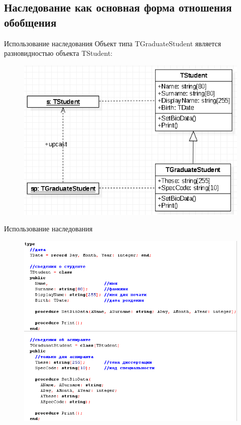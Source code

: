 \documentclass{beamer}
\begin{document}
\subsection{Наследование как основная форма отношения обобщения}
\begin{frame}{Использование наследования}
Объект типа TGraduateStudent является разновидностью объекта TStudent:
\begin{figure}[h]
\centering
\includegraphics[scale=0.5]{images/lec06-pic13.png}
\end{figure}
\end{frame}

\begin{frame}{Использование наследования}
\begin{figure}[h]
\centering
\includegraphics[scale=0.5]{images/lec06-pic14.png}
\end{figure}
\end{frame}
\end{document}

